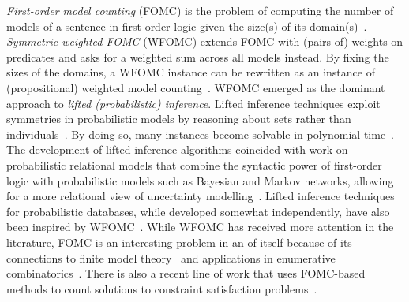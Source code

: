 \documentclass{article}
\begin{document}

\emph{First-order model counting} (FOMC) is the problem of computing the number
of models of a sentence in first-order logic given the size(s) of its
domain(s)~\cite{DBLP:conf/pods/BeameBGS15}. \emph{Symmetric weighted FOMC}
(WFOMC) extends FOMC with (pairs of) weights on predicates and asks for a
weighted sum across all models instead. By fixing the sizes of the domains, a
WFOMC instance can be rewritten as an instance of (propositional) weighted model
counting~\cite{DBLP:journals/ai/ChaviraD08}. WFOMC emerged as the dominant
approach to \emph{lifted (probabilistic) inference}. Lifted inference techniques
exploit symmetries in probabilistic models by reasoning about sets rather than
individuals~\cite{DBLP:conf/ecai/Kersting12}. By doing so, many instances become
solvable in polynomial time~\cite{DBLP:conf/nips/Broeck11}. The development of
lifted inference algorithms coincided with work on probabilistic relational
models that combine the syntactic power of first-order logic with probabilistic
models such as Bayesian and Markov networks, allowing for a more relational view
of uncertainty
modelling~\cite{DBLP:series/synthesis/2016Raedt,DBLP:journals/ml/KimmigMG15,DBLP:journals/ml/RichardsonD06}.
Lifted inference techniques for probabilistic databases, while developed
somewhat independently, have also been inspired by
WFOMC~\cite{DBLP:journals/pvldb/GatterbauerS15,DBLP:journals/debu/GribkoffSB14}.
While WFOMC has received more attention in the literature, FOMC is an
interesting problem in an of itself because of its connections to finite model
theory~\cite{DBLP:conf/kr/BremenK21} and applications in enumerative
combinatorics~\cite{DBLP:conf/ilp/BarvinekB0ZK21}.
There is also a recent line of work that uses FOMC-based methods to count
solutions to constraint satisfaction
problems~\cite{DBLP:journals/jair/TotisDRK23}.

\end{document}
